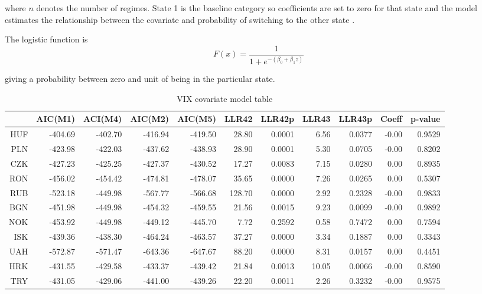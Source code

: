 \documentclass[12pt, a4paper, oneside]{article} %
\begin{document}
where $n$ denotes the number of regimes.  State 1 is the baseline category so coefficients are set to zero for that state and the model estimates the relationship between the covariate and probability of switching to the other state \citet{agresti2014categorical}. 

The logistic function is 
\begin{equation} 
F(x)  = \frac{1}{1 + e^{-(\beta_0 + \beta_1 z)}}
\end{equation}
 
giving a probability between zero and unit of being in the particular state. 

\begin{landscape}
\begin{table}[ht]
\centering
\begin{tabular}{rrrrrrrrrrr}
  \hline
 & AIC(M1) & ACI(M4) & AIC(M2) & AIC(M5) & LLR42 & LLR42p & LLR43 & LLR43p & Coeff & p-value \\ 
  \hline
HUF & -404.69 & -402.70 & -416.94 & -419.50 & 28.80 & 0.0001 & 6.56 & 0.0377 & -0.00 & 0.9529 \\ 
  PLN & -423.98 & -422.03 & -437.62 & -438.93 & 28.90 & 0.0001 & 5.30 & 0.0705 & -0.00 & 0.8202 \\ 
  CZK & -427.23 & -425.25 & -427.37 & -430.52 & 17.27 & 0.0083 & 7.15 & 0.0280 & 0.00 & 0.8935 \\ 
  RON & -456.02 & -454.42 & -474.81 & -478.07 & 35.65 & 0.0000 & 7.26 & 0.0265 & 0.00 & 0.5307 \\ 
  RUB & -523.18 & -449.98 & -567.77 & -566.68 & 128.70 & 0.0000 & 2.92 & 0.2328 & -0.00 & 0.9833 \\ 
  BGN & -451.98 & -449.98 & -454.32 & -459.55 & 21.56 & 0.0015 & 9.23 & 0.0099 & -0.00 & 0.9892 \\ 
  NOK & -453.92 & -449.98 & -449.12 & -445.70 & 7.72 & 0.2592 & 0.58 & 0.7472 & 0.00 & 0.7594 \\ 
  ISK & -439.36 & -438.30 & -464.24 & -463.57 & 37.27 & 0.0000 & 3.34 & 0.1887 & 0.00 & 0.3343 \\ 
  UAH & -572.87 & -571.47 & -643.36 & -647.67 & 88.20 & 0.0000 & 8.31 & 0.0157 & 0.00 & 0.4451 \\ 
  HRK & -431.55 & -429.58 & -433.37 & -439.42 & 21.84 & 0.0013 & 10.05 & 0.0066 & -0.00 & 0.8590 \\ 
  TRY & -431.05 & -429.06 & -441.00 & -439.26 & 22.20 & 0.0011 & 2.26 & 0.3232 & -0.00 & 0.9575 \\ 
   \hline
\end{tabular}
\caption{VIX covariate model table} 
\label{tabref:vixcov}
\end{table}
\end{landscape}
\end{document}
